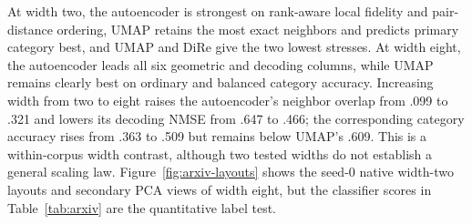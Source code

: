 \documentclass[10pt]{article}
\begin{document}
\begin{table}[H]
\centering
\scriptsize
\setlength{\tabcolsep}{3.4pt}
\caption{arXiv means over three reducer/training seeds at both target widths.  Boldface
is assigned within each width.  ``Decode'' is the shared local-decoding NMSE, not native
autoencoder reconstruction.}
\label{tab:arxiv}
\end{table}

At width two, the autoencoder is strongest on rank-aware local fidelity and pair-distance
ordering, UMAP retains the most exact neighbors and predicts primary category best, and
UMAP and DiRe give the two lowest stresses.  At width eight, the autoencoder leads all
six geometric and decoding columns, while UMAP remains clearly best on ordinary and
balanced category accuracy.  Increasing width from two to eight raises the autoencoder's
neighbor overlap from .099 to .321 and lowers its decoding NMSE from .647 to .466; the
corresponding category accuracy rises from .363 to .509 but remains below UMAP's .609.
This is a within-corpus width contrast, although two tested widths do not establish a
general scaling law.  Figure~\ref{fig:arxiv-layouts} shows the seed-0 native width-two
layouts and secondary PCA views of width eight, but the classifier scores in
Table~\ref{tab:arxiv} are the quantitative label test.
\end{document}
